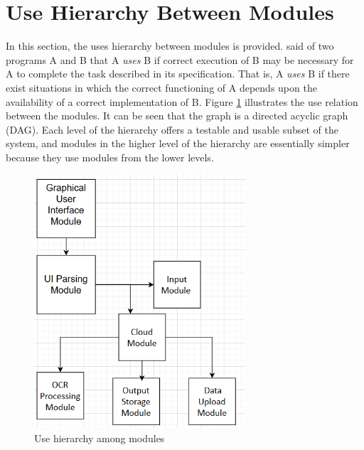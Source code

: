 \documentclass[12pt, titlepage]{article}
\begin{document}
\section{Use Hierarchy Between Modules} \label{SecUse}

In this section, the uses hierarchy between modules is
provided. \citet{Parnas1978} said of two programs A and B that A {\em uses} B if
correct execution of B may be necessary for A to complete the task described in
its specification. That is, A {\em uses} B if there exist situations in which
the correct functioning of A depends upon the availability of a correct
implementation of B.  Figure \ref{FigUH} illustrates the use relation between
the modules. It can be seen that the graph is a directed acyclic graph
(DAG). Each level of the hierarchy offers a testable and usable subset of the
system, and modules in the higher level of the hierarchy are essentially simpler
because they use modules from the lower levels.



\begin{figure}[H]
\centering
\includegraphics[width=0.7\textwidth]{image.png}
\caption{Use hierarchy among modules}
\label{FigUH}
\end{figure}
\end{document}
